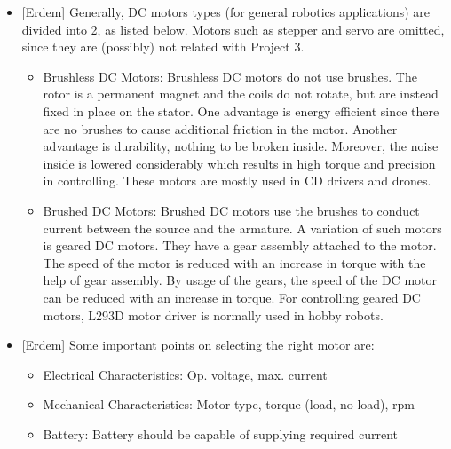 \documentclass[a4paper,12pt]{article}
\begin{document}
\begin{itemize}
	
	\item {[Erdem]} Generally, DC motors types (for general robotics applications) are divided into 2, as listed below. Motors such as stepper and servo are omitted, since they are (possibly) not related with Project 3.
		\begin{itemize}
			\item Brushless DC Motors: Brushless DC motors do not use brushes. The rotor is a permanent magnet and the coils do not rotate, but are instead fixed in place on the stator. One advantage is energy efficient since there are no brushes to cause additional friction in the motor. Another advantage is durability, nothing to be broken inside. Moreover, the noise inside is lowered considerably which results in high torque  and precision in controlling. These motors are mostly used in CD drivers and drones.
			\item Brushed DC Motors: Brushed DC motors use the brushes to conduct current between the source and the armature. A variation of such motors is geared DC motors. They have a gear assembly attached to the motor. The speed of the motor is reduced with an increase in torque with the help of gear assembly. By usage of the gears, the speed of the DC motor can be reduced with an increase in torque. For controlling geared DC motors, L293D motor driver is normally used in hobby robots.
		\end{itemize}
	\item {[Erdem]} Some important points on selecting the right motor are:
		\begin{itemize}
			\item Electrical Characteristics: Op. voltage, max. current
			\item Mechanical Characteristics: Motor type, torque (load, no-load), rpm
			\item Battery: Battery should be capable of supplying required current
		

\end{itemize}
\end{itemize}
\end{document}
